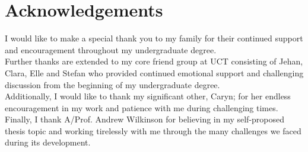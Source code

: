 \section*{Acknowledgements}
I would like to make a special thank you to my family for their continued support and encouragement throughout my undergraduate degree.\\
Further thanks are extended to my core friend group at UCT consisting of Jehan, Clara, Elle and Stefan who provided continued emotional support and challenging discussion from the beginning of my undergraduate degree.\\
Additionally, I would like to thank my significant other, Caryn; for her endless encouragement in my work and patience with me during challenging times.\\
Finally, I thank A/Prof. Andrew Wilkinson for believing in my self-proposed thesis topic and working tirelessly with me through the many challenges we faced during its development.
\newpage